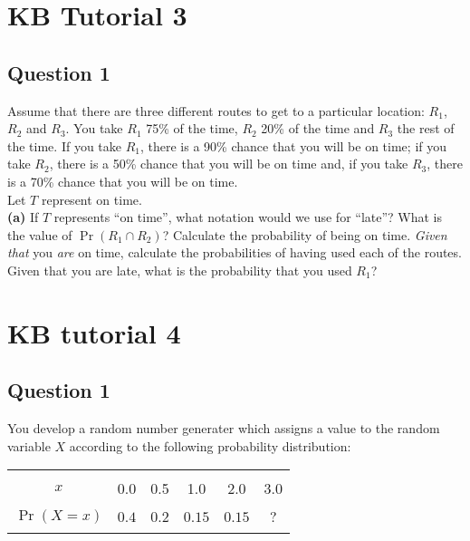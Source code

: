 \documentclass[]{article}
\begin{document}
\section{KB Tutorial 3}
\subsection*{Question 1}
Assume that there are three different routes to get to a particular location: $R_1$, $R_2$ and $R_3$. You take $R_1$ 75\% of the time, $R_2$ 20\% of the time and $R_3$ the rest of the time. If you take $R_1$, there is a 90\% chance that you will be on time; if you take $R_2$, there is a 50\% chance that you will be on time and, if you take $R_3$, there is a 70\% chance that you will be on time. \\[0.1cm]
Let $T$ represent on time.\\[-0.2cm]

{\bf(a)} If $T$ represents ``on time'', what notation would we use for ``late''?  What is the value of $\Pr(R_1 \cap R_2)$?  Calculate the probability of being on time.  \emph{Given that} you \emph{are} on time, calculate the probabilities of having used each of the routes.  Given that you are late, what is the probability that you used $R_1$?






\section{KB tutorial 4}

\subsection*{Question 1}
You develop a random number generater which assigns a value to the random variable $X$ according to the following probability distribution:
\begin{center}
	\begin{tabular}{|c|ccccc|}
		\hline
		&&&&&\\[-0.4cm]
		$x$ & 0.0 & 0.5 & 1.0 & 2.0 & 3.0 \\
		\hline
		&&&&&\\[-0.4cm]
		$\Pr(X=x)$ & $0.4$ & $0.2$ & $0.15$ & $0.15$ & $?$ \\[0.1cm]
		\hline
		\multicolumn{6}{c}{}\\
	\end{tabular}
\end{center}
\end{document}
